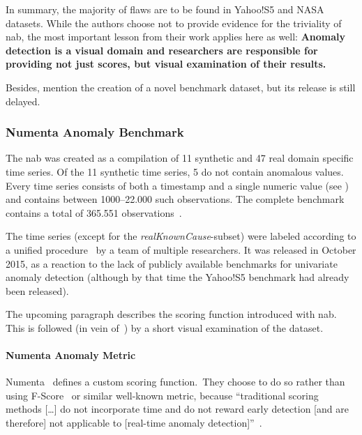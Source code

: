 In summary, the majority of flaws are to be found in Yahoo!S5 and NASA datasets.
While the authors choose not to provide evidence for the triviality of \gls{nab},
the most important lesson from their work applies here as well:
\textbf{Anomaly detection is a visual domain and researchers are responsible for
providing not just scores, but visual examination of their results.}

Besides, \textcite{Renjie.2020} mention the creation of a novel benchmark dataset,
but its release is still delayed. 



\subsubsection{Numenta Anomaly Benchmark}
The \acrfull{nab} was created as a compilation of 11 synthetic and 47 real
domain specific time series. Of the 11 synthetic time series, 5 do not contain
anomalous values. Every time series consists of both a timestamp and a single
numeric value (see ) and contains between 1000--22.000 such
observations. The complete benchmark contains a total of 365.551 observations~\cite{Lavin.2015}.

The time series (except for the \textit{realKnownCause}-subset) were labeled
according to a unified procedure~\cite{Numenta.2015} by a team of
multiple researchers. It was released in October 2015, as a reaction to the lack
of publicly available benchmarks for univariate anomaly detection (although by
that time the Yahoo!S5 benchmark had already been released).

The upcoming paragraph describes the scoring function introduced with \gls{nab}.
This is followed (in vein of~\cite{Renjie.2020}) by a short visual examination
of the dataset.

\paragraph{Numenta Anomaly Metric}
Numenta~\cite{Lavin.2015} defines a custom scoring function.\ They choose to do
so rather than using F-Score~\cite[183]{Murphy.2012} or similar well-known metric,
because ``traditional scoring methods [\dots] do not incorporate time and do not
reward early detection [and are therefore] not applicable to [real-time anomaly detection]''~\cite{Lavin.2015}.

